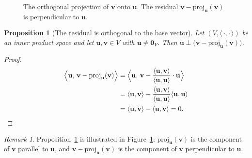 \documentclass[11pt, a4paper, notitlepage]{report}
\newtheorem{proposition}[theorem]{Proposition}
\theoremstyle{definition}
\theoremstyle{remark}
\newtheorem{remark}[theorem]{Remark}
\begin{document}
\begin{figure}[h]
\centering
{}
\caption{The orthogonal projection of $\mathbf{v}$ onto $\mathbf{u}$. The residual
$\mathbf{v} - \mathrm{proj}_{\mathbf{u}}(\mathbf{v})$ is perpendicular to $\mathbf{u}$.}
\label{fig:orth-proj}
\end{figure}

\begin{proposition}[The residual is orthogonal to the base vector]
\label{prop:proj-residual-orth}
Let $(V,\langle\,\cdot,\cdot\,\rangle)$ be an inner product space and let
$\mathbf{u},\mathbf{v}\in V$ with $\mathbf{u}\neq\mathbf{0}_V$.
Then $\mathbf{u}\perp\bigl(\mathbf{v}-\mathrm{proj}_{\mathbf{u}}(\mathbf{v})\bigr)$.
\end{proposition}

\begin{proof}
\begin{align*}
  \Bigl\langle\mathbf{u},\,\mathbf{v}-\mathrm{proj}_{\mathbf{u}}(\mathbf{v})\Bigr\rangle
  &= \Bigl\langle\mathbf{u},\,\mathbf{v}-\frac{\langle\mathbf{u},\mathbf{v}\rangle}{\langle\mathbf{u},\mathbf{u}\rangle}\cdot\mathbf{u}\Bigr\rangle \\
  &= \langle\mathbf{u},\mathbf{v}\rangle
     - \frac{\langle\mathbf{u},\mathbf{v}\rangle}{\langle\mathbf{u},\mathbf{u}\rangle}\langle\mathbf{u},\mathbf{u}\rangle \\
  &= \langle\mathbf{u},\mathbf{v}\rangle - \langle\mathbf{u},\mathbf{v}\rangle = 0. \qedhere
\end{align*}
\end{proof}

\begin{remark}
Proposition~\ref{prop:proj-residual-orth} is illustrated in Figure~\ref{fig:orth-proj}:
$\mathrm{proj}_{\mathbf{u}}(\mathbf{v})$ is the component of $\mathbf{v}$ parallel to $\mathbf{u}$,
and $\mathbf{v}-\mathrm{proj}_{\mathbf{u}}(\mathbf{v})$ is the component of $\mathbf{v}$
perpendicular to $\mathbf{u}$.
\end{remark}
\end{document}
